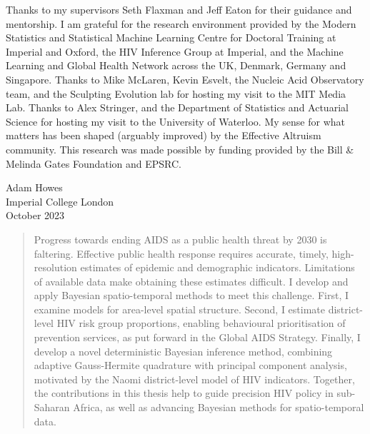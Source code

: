 \documentclass[a4paper, nobind]{templates/ociamthesis}
\begin{document}
\begin{romanpages}
\begin{acknowledgements}
 	Thanks to my supervisors Seth Flaxman and Jeff Eaton for their guidance and mentorship.
 I am grateful for the research environment provided by the Modern Statistics and Statistical Machine Learning Centre for Doctoral Training at Imperial and Oxford, the HIV Inference Group at Imperial, and the Machine Learning and Global Health Network across the UK, Denmark, Germany and Singapore.
 Thanks to Mike McLaren, Kevin Esvelt, the Nucleic Acid Observatory team, and the Sculpting Evolution lab for hosting my visit to the MIT Media Lab.
 Thanks to Alex Stringer, and the Department of Statistics and Actuarial Science for hosting my visit to the University of Waterloo.
 My sense for what matters has been shaped (arguably improved) by the Effective Altruism community.
 This research was made possible by funding provided by the Bill \& Melinda Gates Foundation and EPSRC.

 \begin{flushright}
 Adam Howes \\
 Imperial College London\\
 October 2023
 \end{flushright}
\end{acknowledgements}

\begin{abstract}
	Progress towards ending AIDS as a public health threat by 2030 is faltering.
Effective public health response requires accurate, timely, high-resolution estimates of epidemic and demographic indicators.
Limitations of available data make obtaining these estimates difficult.
I develop and apply Bayesian spatio-temporal methods to meet this challenge.
First, I examine models for area-level spatial structure.
Second, I estimate district-level HIV risk group proportions, enabling behavioural prioritisation of prevention services, as put forward in the Global AIDS Strategy.
Finally, I develop a novel deterministic Bayesian inference method, combining adaptive Gauss-Hermite quadrature with principal component analysis, motivated by the Naomi district-level model of HIV indicators.
Together, the contributions in this thesis help to guide precision HIV policy in sub-Saharan Africa, as well as advancing Bayesian methods for spatio-temporal data.
\end{abstract}


\end{romanpages}
\end{document}
